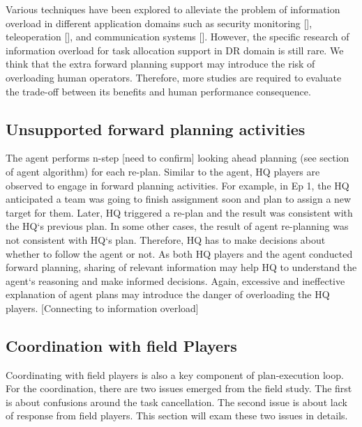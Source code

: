 Various techniques have been explored to alleviate the problem of information overload in different application domains such as security monitoring [], teleoperation [], and communication systems []. However, the specific research of information overload for task allocation support in DR domain is still rare. We think that the extra forward planning support may introduce the risk of overloading human operators. Therefore, more studies are required to evaluate the trade-off between its benefits and human performance consequence.

\subsection{Unsupported forward planning activities}
The agent performs n-step [need to confirm] looking ahead planning (see section of agent algorithm) for each re-plan. Similar to the agent, HQ players are observed to engage in forward planning activities. For example, in Ep 1, the HQ anticipated a team was going to finish assignment soon and plan to assign a new target for them. Later, HQ triggered a re-plan and the result was consistent with the HQ`s previous plan. In some other cases, the result of agent re-planning was not consistent with HQ`s plan. Therefore, HQ has to make decisions about whether to follow the agent or not. As both HQ players and the agent conducted forward planning, sharing of relevant information may help HQ to understand the agent`s reasoning and make informed decisions.  Again, excessive and ineffective explanation of agent plans may introduce the danger of overloading the HQ players.  [Connecting to information overload]

\subsection{Coordination with field Players}
Coordinating with field players is also a key component of plan-execution loop. For the coordination, there are two issues emerged from the field study. The first is about confusions around the task cancellation. The second issue is about lack of response from field players. This section will exam these two issues in details.\\

